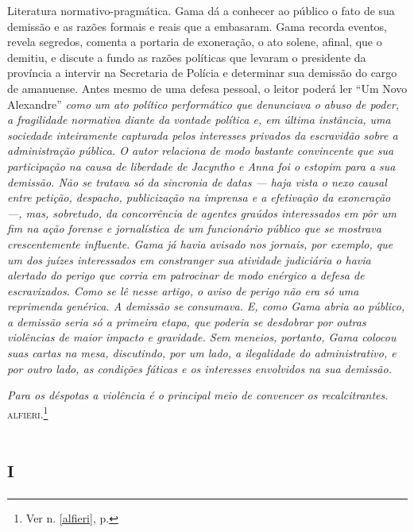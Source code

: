 \begin{didascalia}
Literatura normativo-pragmática. Gama dá a conhecer ao público o fato de
sua demissão e as razões formais e reais que a embasaram. Gama recorda
eventos, revela segredos, comenta a portaria de exoneração, o ato
solene, afinal, que o demitiu, e discute a fundo as razões políticas que
levaram o presidente da província a intervir na Secretaria de Polícia e
determinar sua demissão do cargo de amanuense. Antes mesmo de uma defesa
pessoal, o leitor poderá ler ``Um Novo Alexandre'' \emph{como um ato
político performático que denunciava o abuso de poder, a fragilidade
normativa diante da vontade política e, em última instância, uma
sociedade inteiramente capturada pelos interesses privados da escravidão
sobre a administração pública. O autor relaciona de modo bastante
convincente que sua participação na causa de liberdade de Jacyntho e
Anna foi o estopim para a sua demissão. Não se tratava só da sincronia
de datas --- haja vista o nexo causal entre petição, despacho,
publicização na imprensa e a efetivação da exoneração ---, mas,
sobretudo, da concorrência de agentes graúdos interessados em pôr um fim
na ação forense e jornalística de um funcionário público que se mostrava
crescentemente influente. Gama já havia avisado nos jornais, por
exemplo, que um dos juízes interessados em constranger sua atividade
judiciária o havia alertado do perigo que corria em patrocinar de modo
enérgico a defesa de escravizados. Como se lê nesse artigo, o aviso de
perigo não era só uma reprimenda genérica. A demissão se consumava. E,
como Gama abria ao público, a demissão seria só a primeira etapa, que
poderia se desdobrar por outras violências de maior impacto e gravidade.
Sem meneios, portanto, Gama colocou suas cartas na mesa, discutindo, por
um lado, a ilegalidade do administrativo, e por outro lado, as condições
fáticas e os interesses envolvidos na sua demissão.}
\end{didascalia}



\emph{Para os déspotas a violência é o principal meio de convencer os
recalcitrantes}. 
\textsc{alfieri}.\footnote{Ver n. \ref{alfieri}, p. \pageref{alfieri}}

\section{\textsc{i}}

